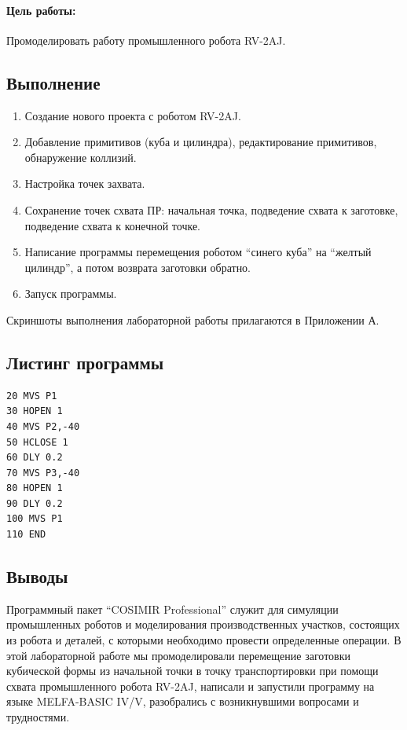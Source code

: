 \paragraph{Цель работы:} Промоделировать работу промышленного робота RV-2AJ.

\subsection*{Выполнение}

\begin{enumerate}
	\item Создание нового проекта с роботом RV-2AJ.
	\item Добавление примитивов (куба и цилиндра), редактирование примитивов, обнаружение коллизий.
	\item Настройка точек захвата.
	\item Сохранение точек схвата ПР: начальная точка, подведение схвата к заготовке, подведение схвата к конечной точке.
	\item Написание программы перемещения роботом ``синего куба'' на ``желтый цилиндр'', а потом возврата заготовки обратно.
	\item Запуск программы.
\end{enumerate}

Скриншоты выполнения лабораторной работы прилагаются в Приложении А.

\subsection*{Листинг программы}

\begin{verbatim}
20 MVS P1
30 HOPEN 1
40 MVS P2,-40
50 HCLOSE 1
60 DLY 0.2
70 MVS P3,-40
80 HOPEN 1
90 DLY 0.2
100 MVS P1
110 END
\end{verbatim}

\subsection*{Выводы}

Программный пакет ``COSIMIR Professional'' служит для симуляции промышленных роботов и моделирования производственных участков, состоящих из робота и деталей, с которыми необходимо провести определенные операции. В этой лабораторной работе мы промоделировали перемещение заготовки кубической формы из начальной точки в точку транспортировки при помощи схвата промышленного робота RV-2AJ, написали и запустили программу на языке MELFA-BASIC IV/V, разобрались с возникнувшими вопросами и трудностями.

